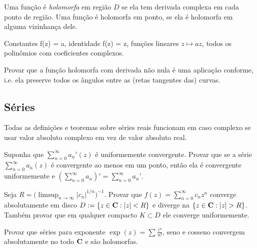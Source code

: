 \begin{defin} Uma função é \emph{holomorfa} em região $D$ se ela tem derivada complexa em cada ponto de região.
Uma função é holomorfa em ponto, se ela é holomorfa em alguma vizinhança dele.
\end{defin}

\begin{exem}
Constantes f(z) = a,
identidade f(z) = z,
funções lineares $z \mapsto a z$,
todos os polinômios com coeficientes complexos.
\end{exem}

\begin{problema}
Provar que a função holomorfa com derivada não nula é uma aplicação conforme,
i.e. ela preserve todos os ângulos entre as (retas tangentes das) curvas.
\end{problema}


\subsection{Séries}

Todas as definições e teoremas sobre séries reais funcionam em caso complexo
se usar valor absoluto complexo em vez de valor absoluto real.

\begin{problema}
Suponha que $\sum_{n=0}^\infty a_n'(z)$ é uniformemente convergente.
Provar que se a série $\sum_{n=0}^\infty a_n(z)$ é convergente ao menos em um ponto,
então ela é convergente uniformemente e $(\sum_{n=0}^\infty a_n)' = \sum_{n=0}^\infty a_n'$.
\end{problema}

\begin{problema}
Seja $R = \big(\limsup_{n\to\infty} |c_n|^{1/n}\big)^{-1}$. Provar que $f(z) = \sum_{n=0}^\infty c_n z^n$
converge absolutamente em disco $D := \{z\in\mathbf{C}: |z|<R\}$ e diverge na $\{z\in\mathbf{C}: |z| >R\}$.
Também provar que em qualquer compacto $K\subset D$ ele converge uniformemente.
\end{problema}

\begin{problema}
Provar que séries para exponente $\exp(z) = \sum \frac{z^n}{n!}$,
seno e cosseno convergem absolutamente no todo $\mathbf{C}$ e são holomorfas.

\end{problema}

